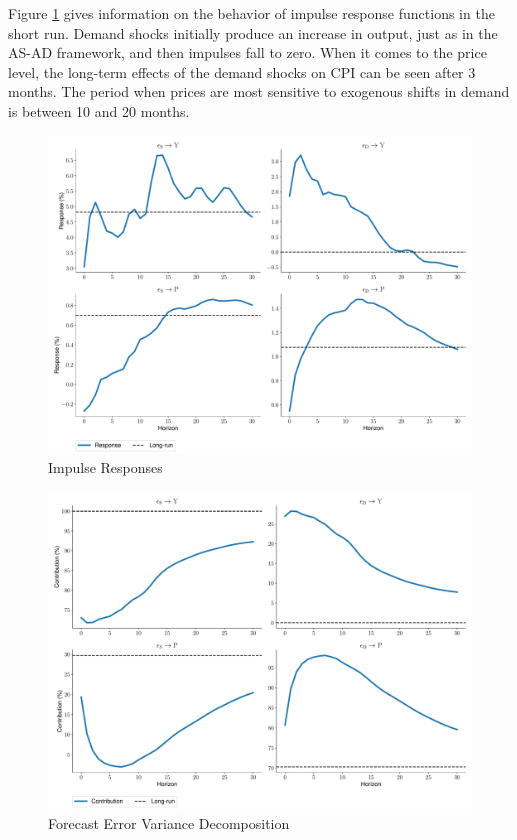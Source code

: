 \documentclass[a4paper,12pt]{article}
\begin{document}
Figure \ref{fig:3} gives information on the behavior of impulse response functions in the short run. Demand shocks initially produce an increase in output, just as in the AS-AD framework, and then impulses fall to zero. When it comes to the price level, the long-term effects of the demand shocks on CPI can be seen after 3 months. The period when prices are most sensitive to exogenous shifts in demand is between 10 and 20 months.

\begin{figure}[h]
    \centering
\caption{Impulse Responses}
\label{fig:3}
    \includegraphics[width=\textwidth]{../output/figures/IR.pdf} 
\end{figure}

\begin{figure}[H]
    \centering
\caption{Forecast Error Variance Decomposition}
\label{fig:4}
    \includegraphics[width=\textwidth]{../output/figures/FEVD.pdf} 
\end{figure}
\end{document}
